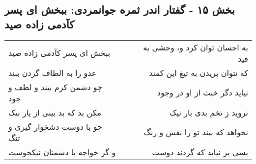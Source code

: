 \begin{center}
\section*{بخش ۱۵ - گفتار اندر ثمره جوانمردی: ببخش ای پسر کآدمی زاده صید}
\label{sec:015}
\begin{longtable}{l p{0.5cm} r}
ببخش ای پسر کآدمی زاده صید
&&
به احسان توان کرد و، وحشی به قید
\\
عدو را به الطاف گردن ببند
&&
که نتوان بریدن به تیغ این کمند
\\
چو دشمن کرم بیند و لطف و جود
&&
نیاید دگر خبث از او در وجود
\\
مکن بد که بد بینی از یار نیک
&&
نروید ز تخم بدی بار نیک
\\
چو با دوست دشخوار گیری و تنگ
&&
نخواهد که بیند تو را نقش و رنگ
\\
و گر خواجه با دشمنان نیکخوست
&&
بسی بر نیاید که گردند دوست
\\
\end{longtable}
\end{center}
